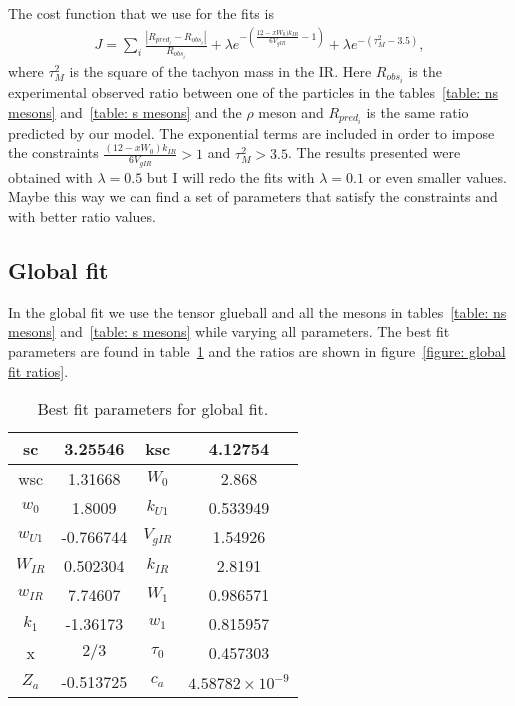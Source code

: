 \documentclass[10 pt]{article}
\begin{document}
The cost function that we use for the fits is
\begin{align}
J = \sum_{i} \frac{|R_{pred_i} - R_{obs_i}|}{R_{obs_i}} + \lambda e^{- \left(\frac{12-x W_0)k_{IR}}{6 V_{gIR}} - 1\right)} + \lambda e^{-\left( \tau_M^2 - 3.5 \right)},
\end{align}
where $\tau_M^2$ is the square of the tachyon mass in the IR. Here $R_{obs_i}$ is the experimental observed ratio between one of the particles in the tables~\ref{table: ns mesons} and~\ref{table: s mesons} and the $\rho$ meson and $R_{pred_i}$ is the same ratio predicted by our model. The exponential terms are included in order to impose the constraints $\frac{\left(12-x W_0\right)k_{IR}}{6 V_{gIR}} > 1$ and $\tau_M^2 > 3.5$. The results presented were obtained with $\lambda = 0.5$ but I will redo the fits with $\lambda = 0.1$ or even smaller values. Maybe this way we can find a set of parameters that satisfy the constraints and with better ratio values.

\subsection{Global fit}

In the global fit we use the tensor glueball  and all the mesons in tables~\ref{table: ns mesons} and~\ref{table: s mesons} while varying all parameters. The best fit parameters are found in table~\ref{table: global fit parameters} and the ratios are shown in figure~\ref{figure: global fit ratios}.

\begin{table}
\centering
\begin{tabular}{ | c | c | c | c |}
\hline
sc & 3.25546 & ksc & 4.12754 \\
\hline
wsc & 1.31668& $W_0$ & 2.868 \\
\hline
$w_0$ & 1.8009 & $k_{U1}$ & 0.533949 \\
\hline
$w_{U1}$ & -0.766744 & $V_{gIR}$ & 1.54926 \\
\hline
$W_{IR}$ & 0.502304 & $k_{IR}$ & 2.8191 \\
\hline
$w_{IR}$ & 7.74607 & $W_1$ & 0.986571 \\
\hline
$k_1$ & -1.36173 & $w_1$ & 0.815957 \\
\hline
x & $2/3$ & $\tau_0$ & 0.457303\\
\hline
$Z_a$ & -0.513725 & $c_a$ & $4.58782 \times 10^{-9} $\\
\hline
\end{tabular}
\caption{Best fit parameters for global fit.}
\label{table: global fit parameters} 
\end{table}
\end{document}
